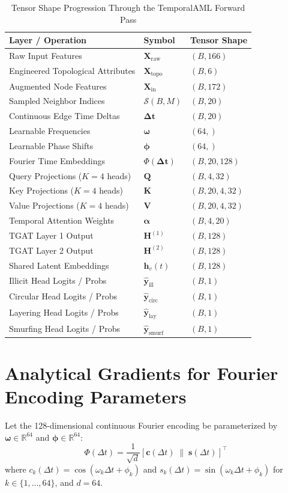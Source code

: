 \begin{table}[!htbp]
\centering
\caption{Tensor Shape Progression Through the TemporalAML Forward Pass}
\label{tab:tensor_dimensions}
\begin{tabular}{lll}
\hline
\textbf{Layer / Operation} & \textbf{Symbol} & \textbf{Tensor Shape} \\
\hline
Raw Input Features & $\mathbf{X}_{\text{raw}}$ & $(B, 166)$ \\
Engineered Topological Attributes & $\mathbf{X}_{\text{topo}}$ & $(B, 6)$ \\
Augmented Node Features & $\mathbf{X}_{\text{in}}$ & $(B, 172)$ \\
Sampled Neighbor Indices & $\mathcal{S}(B, M)$ & $(B, 20)$ \\
Continuous Edge Time Deltas & $\boldsymbol{\Delta t}$ & $(B, 20)$ \\
Learnable Frequencies & $\boldsymbol{\omega}$ & $(64,)$ \\
Learnable Phase Shifts & $\boldsymbol{\phi}$ & $(64,)$ \\
Fourier Time Embeddings & $\Phi(\boldsymbol{\Delta t})$ & $(B, 20, 128)$ \\
Query Projections ($K=4$ heads) & $\mathbf{Q}$ & $(B, 4, 32)$ \\
Key Projections ($K=4$ heads) & $\mathbf{K}$ & $(B, 20, 4, 32)$ \\
Value Projections ($K=4$ heads) & $\mathbf{V}$ & $(B, 20, 4, 32)$ \\
Temporal Attention Weights & $\boldsymbol{\alpha}$ & $(B, 4, 20)$ \\
TGAT Layer 1 Output & $\mathbf{H}^{(1)}$ & $(B, 128)$ \\
TGAT Layer 2 Output & $\mathbf{H}^{(2)}$ & $(B, 128)$ \\
Shared Latent Embeddings & $\mathbf{h}_v(t)$ & $(B, 128)$ \\
Illicit Head Logits / Probs & $\hat{\mathbf{y}}_{\text{ill}}$ & $(B, 1)$ \\
Circular Head Logits / Probs & $\hat{\mathbf{y}}_{\text{circ}}$ & $(B, 1)$ \\
Layering Head Logits / Probs & $\hat{\mathbf{y}}_{\text{lay}}$ & $(B, 1)$ \\
Smurfing Head Logits / Probs & $\hat{\mathbf{y}}_{\text{smurf}}$ & $(B, 1)$ \\
\hline
\end{tabular}
\end{table}

\section{Analytical Gradients for Fourier Encoding Parameters}
Let the 128-dimensional continuous Fourier encoding be parameterized by $\boldsymbol{\omega} \in \mathbb{R}^{64}$ and $\boldsymbol{\phi} \in \mathbb{R}^{64}$:
\begin{equation}
    \Phi(\Delta t) = \frac{1}{\sqrt{d}} \left[ \mathbf{c}(\Delta t) \;\Big\|\; \mathbf{s}(\Delta t) \right]^\top
\end{equation}
where $c_k(\Delta t) = \cos(\omega_k \Delta t + \phi_k)$ and $s_k(\Delta t) = \sin(\omega_k \Delta t + \phi_k)$ for $k \in \{1, \dots, 64\}$, and $d = 64$.


